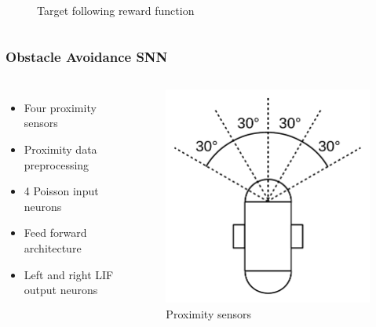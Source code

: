 \begin{frame}
\begin{columns}
\begin{overprint}
\begin{figure}
					\caption{Target following reward function}
					\label{fig:angle_reward}
				\end{figure}
			\end{overprint}
	\end{columns}
\end{frame}

\begin{frame}
	\frametitle{Obstacle Avoidance SNN}
	\begin{columns}
			\begin{itemize}
				\item <1-> Four proximity sensors
				\item <2-> Proximity data preprocessing
				\item <3-> 4 Poisson input neurons
				\item <3-> Feed forward architecture
				\item <3-> Left and right LIF output neurons
			\end{itemize}
			\begin{overprint}
				\begin{figure}
					\centering
					\includegraphics[height=0.7\textheight]{img/sensors_b.pdf}
					\caption{Proximity sensors}
					\label{fig:sensor_b}

\end{figure}
\end{overprint}
\end{columns}
\end{frame}
